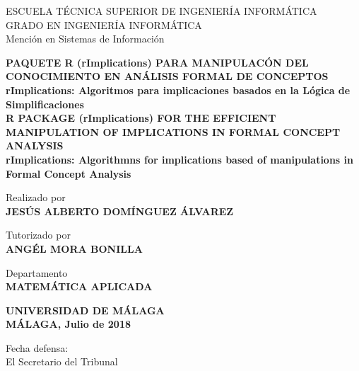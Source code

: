 \newpage
\thispagestyle{empty}
\mbox{}
\newpage
\thispagestyle{empty}
\mbox{}

\begin{titlepage}

    \begin{center}
		\normalsize {
            ESCUELA T\'ECNICA SUPERIOR DE INGENIER\'IA INFORM\'ATICA \\
            GRADO EN INGENIER\'IA INFORM\'ATICA \\
            Menci\'on en Sistemas de Informaci\'on \\}
	\end{center}

    \bigskip

    \begin{center}
		\normalsize {\textbf{
            PAQUETE R (rImplications) PARA MANIPULAC\'ON DEL CONOCIMIENTO 
            EN AN\'ALISIS FORMAL DE CONCEPTOS\\ 
            rImplications: Algoritmos para implicaciones basados
            en la L\'ogica de Simplificaciones\\ 
            R PACKAGE (rImplications) FOR THE EFFICIENT MANIPULATION OF
            IMPLICATIONS IN FORMAL CONCEPT ANALYSIS \\
            rImplications: Algorithmns for implications based
            of manipulations in Formal Concept Analysis
            }}
    \end{center}
    
    \smallskip

    \begin{center}
		\normalsize {
            Realizado por \\ \textbf{JES\'US ALBERTO DOM\'INGUEZ \'ALVAREZ}}
    \end{center}

    \begin{center}
		\normalsize {
            Tutorizado por \\ \textbf{ANG\'EL MORA BONILLA}}
    \end{center}

    \begin{center}
		\normalsize {
            Departamento \\ \textbf{MATEM\'ATICA APLICADA}}
    \end{center}

    \begin{center}
		\normalsize {
            \textbf{UNIVERSIDAD DE M\'ALAGA \\ M\'ALAGA, Julio de 2018}}
    \end{center}

    \bigskip

    \bigskip

    \begin{flushleft}
		\normalsize {
            Fecha defensa: \\ El Secretario del Tribunal}
    \end{flushleft}

\end{titlepage}

\newpage
\thispagestyle{empty}
\mbox{}

\newpage